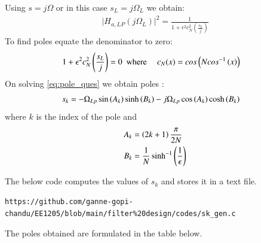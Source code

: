 \documentclass{article}
\begin{document}
\begin{enumerate}
Using $s=j\Omega$ or in this case $s_{L}=j\Omega_{L}$ we obtain:
\begin{align}
    \vert H_{a,LP}(j\Omega_L)\vert^2 = \frac{1}{1 + \epsilon^2c_N^2(\frac{s_L}{j})}
\end{align}
To find poles equate the denominator to zero:
\begin{align}
    {1 + \epsilon^2c_N^2\ensuremath{\left(\frac{s_L}{j}\right)}} &=0\hspace{5pt }
    \text{where } \hspace{10pt} c_N(x) = cos\left(Ncos^{-1}\left(x\right)\right) \label{eq:pole_ques}
\end{align}
On solving \eqref{eq:pole_ques} we obtain poles :
\begin{align}
    s_{k} &= -\Omega_{Lp} \sin\left(A_k\right)\sinh\left(B_k\right) - j\Omega_{Lp}\cos\left(A_k\right)\cosh\left(B_k\right)
\end{align}
where $k$ is the index of the pole and \\
\begin{align}
    A_k &= \left(2k+1\right)\frac{\pi}{2N}\\
    B_k &= \frac{1}{N} \sinh^{-1}\left(\frac{1}{\epsilon}\right)
\end{align}

The below code computes the values of $s_k$ and stores it in a text file. 
\begin{lstlisting}
https://github.com/ganne-gopi-chandu/EE1205/blob/main/filter%20design/codes/sk_gen.c
\end{lstlisting}
The poles obtained are formulated in the table below.



\end{enumerate}
\end{document}
